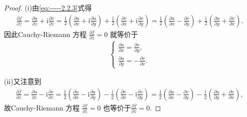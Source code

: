 \documentclass[../../main.tex]{subfiles}%
\begin{document}
\begin{proof}
(i)由\eqref{eq:-----2.2.3}式得
\begin{align*}
\frac{\partial f}{\partial \overline{z}}=\frac{\partial u}{\partial \overline{z}} + \mathrm{i}\frac{\partial v}{\partial \overline{z}}=\frac{1}{2}\left(\frac{\partial u}{\partial x}+\mathrm{i}\frac{\partial u}{\partial y}\right)+\frac{\mathrm{i}}{2}\left(\frac{\partial v}{\partial x}+\mathrm{i}\frac{\partial v}{\partial y}\right)=\frac{1}{2}\left(\frac{\partial u}{\partial x}-\frac{\partial v}{\partial y}\right)+\frac{\mathrm{i}}{2}\left(\frac{\partial u}{\partial y}+\frac{\partial v}{\partial x}\right).
\end{align*}
因此Cauchy-Riemann 方程 $\frac{\partial f}{\partial \overline{z}} = 0$ 就等价于
\begin{align*}
\begin{cases}
\frac{\partial u}{\partial x}=\frac{\partial v}{\partial y},\\
\frac{\partial u}{\partial y}=-\frac{\partial v}{\partial x}.
\end{cases}
\end{align*}

(ii)又注意到
\begin{align*}
\frac{\partial \overline{f}}{\partial z}=\frac{\partial u}{\partial z}-\mathrm{i}\frac{\partial v}{\partial z}=\frac{1}{2}\left( \frac{\partial u}{\partial x}-\mathrm{i}\frac{\partial u}{\partial y} \right) -\frac{\mathrm{i}}{2}\left( \frac{\partial v}{\partial x}-\mathrm{i}\frac{\partial v}{\partial y} \right) =\frac{1}{2}\left( \frac{\partial u}{\partial x}-\frac{\partial v}{\partial y} \right) -\frac{\mathrm{i}}{2}\left( \frac{\partial u}{\partial y}+\frac{\partial v}{\partial x} \right) ,
\end{align*}
故Cauchy-Riemann 方程 $\frac{\partial f}{\partial \overline{z}} = 0$ 也等价于$\frac{\partial \overline{f}}{\partial z}=0.$


\end{proof}
\end{document}
